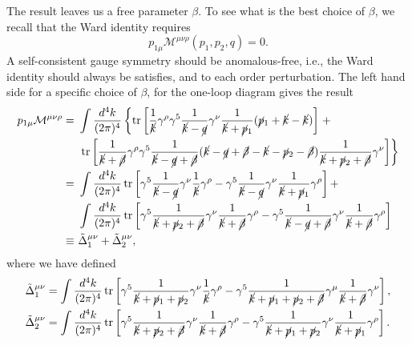 The result leaves us a free parameter $\beta$.
To see what is the best choice of $\beta$, we recall that the Ward identity requires
\begin{equation}
	p_{1\mu} \mathcal{M}^{\mu\nu\rho}(p_1,p_2,q) = 0.
\end{equation}
A self-consistent gauge symmetry should be anomalous-free, i.e., the Ward identity should always be satisfies, and to each order perturbation. 
The left hand side for a specific choice of $\beta$, for the one-loop diagram gives the result
\begin{equation}
\begin{aligned}
	p_{1\mu} \mathcal{M}^{\mu\nu\rho} 
	=&\ \int \frac{d^{4} k}{(2 \pi)^{4}} \left\{\operatorname{tr}\left[\frac{1}{\cancel k} \gamma^\rho \gamma^{5} \frac{1}{\cancel k-\cancel q} \gamma^{\nu} \frac{1}{\cancel k+\cancel p_{1}} (\cancel p_1 +\cancel k -\cancel k) \right] \right. + \\
	&\ \left.\operatorname{tr}\left[\frac{1}{\cancel k +\cancel \beta} \gamma^\rho \gamma^{5} \frac{1}{\cancel k-\cancel q+\cancel\beta} (\cancel k -\cancel q +\cancel \beta -\cancel k -\cancel p_2-\cancel \beta) \frac{1}{\cancel k+\cancel p_{2}+\cancel \beta} \gamma^\nu \right]\right\} \\
	=&\ \int \frac{d^{4} k}{(2 \pi)^{4}} \operatorname{tr}\left[\gamma^{5} \frac{1}{\cancel k - \cancel q} \gamma^\nu \frac{1}{\cancel k} \gamma^{\rho} - \gamma^{5} \frac{1}{\cancel k - \cancel q} \gamma^\nu \frac{1}{\cancel k+\cancel p_1} \gamma^{\rho}\right]+ \\
	&\ \int \frac{d^{4} k}{(2 \pi)^{4}} \operatorname{tr}\left[\gamma^{5} \frac{1}{\cancel k+\cancel p_2+\cancel\beta} \gamma^{\nu} \frac{1}{\cancel k+\cancel \beta} \gamma^\rho -\gamma^5\frac{1}{\cancel k-\cancel q+\cancel\beta}\gamma^\nu\frac{1}{\cancel k+\cancel\beta}\gamma^\rho\right] \\
	\equiv &\ \tilde\Delta^{\mu\nu}_1 + \tilde\Delta^{\mu\nu}_2,
\end{aligned}
\end{equation}
where we have defined
\begin{equation}
\begin{aligned}
	\tilde\Delta^{\mu\nu}_1 &= \int \frac{d^{4} k}{(2 \pi)^{4}} \operatorname{tr}\left[
		\gamma^{5} \frac{1}{\cancel k + \cancel p_1 +\cancel p_2} \gamma^\nu \frac{1}{\cancel k} \gamma^{\rho} -
		\gamma^5\frac{1}{\cancel k+ \cancel p_1 +\cancel p_2+\cancel\beta}\gamma^\mu\frac{1}{\cancel k+\cancel\beta}\gamma^\nu 
	\right], \\
	\tilde\Delta^{\mu\nu}_2 &= \int \frac{d^{4} k}{(2 \pi)^{4}} \operatorname{tr}\left[
		\gamma^{5} \frac{1}{\cancel k+\cancel p_2+\cancel\beta} \gamma^{\nu} \frac{1}{\cancel k+\cancel \beta} \gamma^\rho -
		\gamma^{5} \frac{1}{\cancel k + \cancel p_1+\cancel p_2} \gamma^\nu \frac{1}{\cancel k+\cancel p_1} \gamma^{\rho}
	\right].
\end{aligned}
\end{equation}
